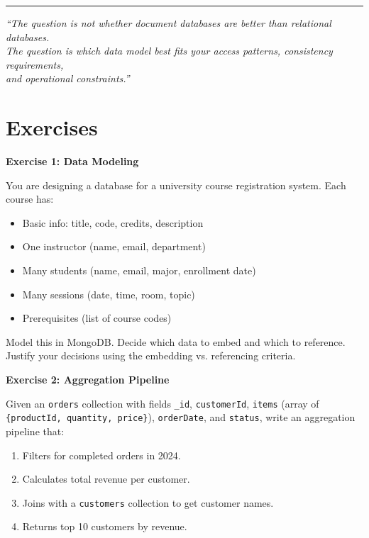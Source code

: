 \documentclass[12pt,a4paper]{article}
\begin{document}
\vspace{1cm}
\noindent\rule{\textwidth}{0.4pt}
\begin{center}
\textit{``The question is not whether document databases are better than relational databases.\\The question is which data model best fits your access patterns, consistency requirements,\\and operational constraints.''}
\end{center}

\section{Exercises}

\begin{exercise}
\textbf{Exercise 1: Data Modeling}

You are designing a database for a university course registration system. Each course has:
\begin{itemize}[noitemsep]
    \item Basic info: title, code, credits, description
    \item One instructor (name, email, department)
    \item Many students (name, email, major, enrollment date)
    \item Many sessions (date, time, room, topic)
    \item Prerequisites (list of course codes)
\end{itemize}

Model this in MongoDB. Decide which data to embed and which to reference. Justify your decisions using the embedding vs. referencing criteria.
\end{exercise}

\begin{exercise}
\textbf{Exercise 2: Aggregation Pipeline}

Given an \texttt{orders} collection with fields \texttt{\_id}, \texttt{customerId}, \texttt{items} (array of \texttt{\{productId, quantity, price\}}), \texttt{orderDate}, and \texttt{status}, write an aggregation pipeline that:
\begin{enumerate}[noitemsep]
    \item Filters for completed orders in 2024.
    \item Calculates total revenue per customer.
    \item Joins with a \texttt{customers} collection to get customer names.
    \item Returns top 10 customers by revenue.
\end{enumerate}
\end{exercise}
\end{document}
